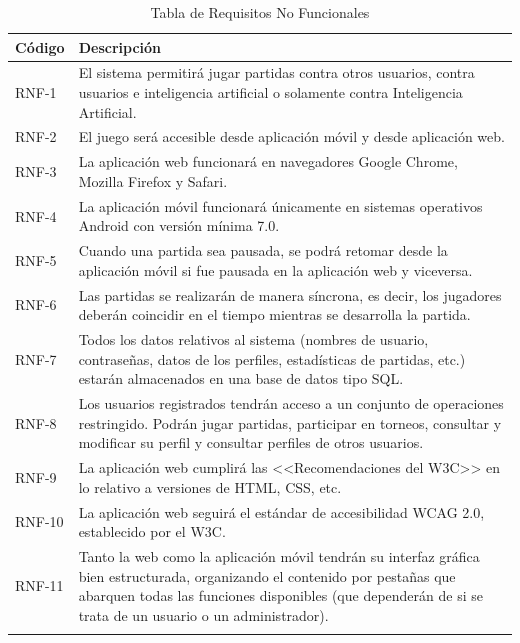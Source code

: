 \documentclass{article}
\begin{document}
\begin{center}
    \begin{longtable}{ | p{} | p{} | }
        \hline
        \textbf{Código} & \textbf{Descripción} \\
        \hline
        RNF-1 & El sistema permitirá jugar partidas contra otros usuarios, contra usuarios e inteligencia artificial o solamente contra Inteligencia Artificial. \\
        \hline
        RNF-2 & El juego será accesible desde aplicación móvil y desde aplicación web. \\
        \hline
        RNF-3 & La aplicación web funcionará en navegadores Google Chrome, Mozilla Firefox y Safari. \\
        \hline
        RNF-4 & La aplicación móvil funcionará únicamente en sistemas operativos Android con versión mínima 7.0. \\ %
        \hline
        RNF-5 & Cuando una partida sea pausada, se podrá retomar desde la aplicación móvil si fue pausada en la aplicación web y viceversa. \\
        \hline
        RNF-6 & Las partidas se realizarán de manera síncrona, es decir, los jugadores deberán coincidir en el tiempo mientras se desarrolla la partida. \\
        \hline
        RNF-7 & Todos los datos relativos al sistema (nombres de usuario, contraseñas, datos de los perfiles, estadísticas de partidas, etc.) estarán almacenados en una base de datos tipo SQL. \\
        \hline
        RNF-8 & Los usuarios registrados tendrán acceso a un conjunto de operaciones restringido. Podrán jugar partidas, participar en torneos, consultar y modificar su perfil y consultar perfiles de otros usuarios. \\
        \hline
        RNF-9 & La aplicación web cumplirá las <<Recomendaciones del W3C>> en lo relativo a versiones de HTML, CSS, etc. \\
        \hline
        RNF-10 & La aplicación web seguirá el estándar de accesibilidad WCAG 2.0, establecido por el W3C. \\
        \hline
        RNF-11 & Tanto la web como la aplicación móvil tendrán su interfaz gráfica bien estructurada, organizando el contenido por pestañas que abarquen todas las funciones disponibles (que dependerán de si se trata de un usuario o un administrador). \\
        \hline
        
        \caption{Tabla de Requisitos No Funcionales}
    \end{longtable}
\end{center}
\end{document}
